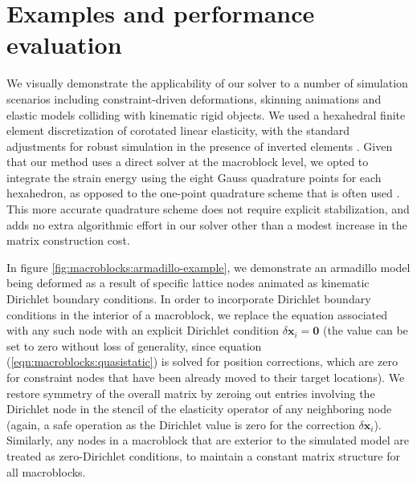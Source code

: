 
\section{Examples and performance evaluation}
\label{sec:macroblocks:examples}

We visually demonstrate the applicability of our solver to a number of
simulation scenarios including constraint-driven deformations,
skinning animations and elastic models colliding with kinematic rigid
objects.  We used a hexahedral finite element discretization of
corotated linear elasticity, with the standard adjustments for robust
simulation in the presence of inverted elements
\cite{IrvinTF:2004}. Given that our method uses a direct solver at the
macroblock level, we opted to integrate the strain energy using the
eight Gauss quadrature points for each hexahedron, as opposed to the
one-point quadrature scheme that is often used
\cite{McAdaZSETTS:2011,PatteMS:2012}. This more accurate quadrature
scheme does not require explicit stabilization, and adds no extra
algorithmic effort in our solver other than a modest increase in the
matrix construction cost.

In figure \ref{fig:macroblocks:armadillo-example}, we demonstrate an armadillo
model being deformed as a result of specific lattice nodes animated as
kinematic Dirichlet boundary conditions. In order to incorporate
Dirichlet boundary conditions in the interior of a macroblock, we
replace the equation associated with any such node with an explicit
Dirichlet condition $\delta\mathbf{x}_i=\mathbf{0}$ (the value can be
set to zero without loss of generality, since equation
(\ref{eqn:macroblocks:quasistatic}) is solved for position corrections, which are
zero for constraint nodes that have been already moved to their target
locations). We restore symmetry of the overall matrix by zeroing out
entries involving the Dirichlet node in the stencil of the elasticity
operator of any neighboring node (again, a safe operation as the
Dirichlet value is zero for the correction
$\delta\mathbf{x}_i$). Similarly, any nodes in a macroblock that are
exterior to the simulated model are treated as zero-Dirichlet
conditions, to maintain a constant matrix structure for all
macroblocks.

